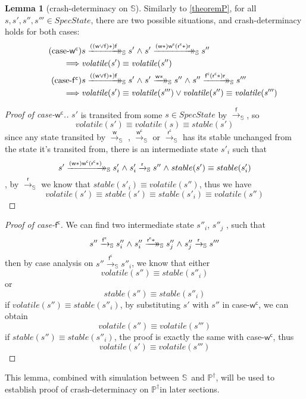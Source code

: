\documentclass[letterpaper,twocolumn,10pt]{article}
\theoremstyle{definition}
\newtheorem{lemma}[theorem]{Lemma}
\newcommand{\conj}{\mathrel\land}
\renewcommand{\i}[1]{\ensuremath{\mathit{#1}}}
\newcommand{\Spec}{\ensuremath{\mathbb S}}
\newcommand{\ProgInv}{\ensuremath{\mathbb P^\dagger}}
\newcommand{\actw}{\mathsf w}
\newcommand{\actwc}{\mathsf w^\mathsf{c}}
\newcommand{\actf}{\mathsf f}
\newcommand{\actr}{\mathsf r}
\newcommand{\actfc}{\mathsf{f^c}}
\newcommand{\actrc}{\mathsf{r^c}}
\newcommand{\ttIn}[2]{\xrightarrow{#1}_{#2}}
\newcommand{\dxrightarrow}[1]{\xrightarrow{#1}\mathrel{\mkern-14mu}\rightarrow}
\newcommand{\ttsIn}[2]{\dxrightarrow{#1}_{#2}}
\newcommand{\ttS}[1]{\ttIn{#1}{\Spec}}
\newcommand{\ttsS}[1]{\ttsIn{#1}{\Spec}}
\begin{document}
\begin{lemma}[crash-determinacy on \Spec]\label{cdS}
	Similarly to \cref{theoremP}, for all $s, s',s'', s''' \in \i{SpecState}$, there are two possible situations, and crash-determinacy holds for both cases:
	\begin{align*}
		\tag{case-$\actwc$}
			&s \ttsS{\i{((\actw \lor \actf)\ast)} \actf} s' \conj s' \ttsS{\i{(\actw\ast)} \actwc \i{(\actrc\ast)} \actr} s'' \\
		\implies &\i{volatile(s')} \equiv \i{volatile(s'')}
\\
		\tag{case-$\actfc$}
		&s \ttsS{(\i{(\actw \lor \actf)\ast}) \actf} s' \conj
	  s' \ttsS{\i{\actw\ast}} s'' \conj
	  s'' \ttsS{\actfc  (\i{\actrc\ast}) \actr } s'''\\
		\implies &\i{volatile(s')} \equiv \i{volatile(s''')} \lor \i{volatile(s'')} \equiv \i{volatile(s''')}
	\end{align*}
\end{lemma}
\begin{proof}[Proof of case-\i{\actwc}.]
	$s'$ is transited from some $s \in \i{SpecState}$ by \i{\ttS{\actf}}, so
		$$\i{volatile(s')} \equiv \i{volatile(s)} \equiv \i{stable(s')}$$
	since any state transited by \i{\ttS{\actw}} , \i{\ttS{\actwc}} or \i{\ttS{\actrc}} has its stable unchanged from the state it's transited from, there is an intermediate state $s'_i$ such that
		$$s' \ttsS{\i{(\actw\ast)} \actwc \i{(\actrc*)}} s'_i \conj s'_i \ttS{\actr} s'' \conj stable(s') \equiv stable(s'_i)$$
	, by \i{\ttS{\actr}} we know that $\i{stable(s'_i) \equiv volatile(s'')}$, thus we have
		$$\i{volatile(s') \equiv stable(s') \equiv stable(s'_i) \equiv volatile(s'')}$$
\end{proof}
\begin{proof}[Proof of case-\i{\actfc}]
	We can find two intermediate state $s''_i$, $s''_j$ , such that $$s'' \ttS{\actfc} s''_i \conj s''_i \ttsS{\actrc*} s''_j \conj s''_j  \ttS{\actr} s'''$$
	then by case analysis on $s'' \ttS{\actfc} s''_i$, we know that either $$\i{volatile(s'') \equiv stable(s''_i)}$$ or $$\i{stable(s'') \equiv stable(s''_i)}$$
	if $\i{volatile(s'') \equiv stable(s''_i)}$, by substituting $s'$ with $s''$ in
	\mbox{case-$\actwc$}, we can obtain $$\i{volatile(s'') \equiv volatile(s''')}$$
	if $\i{stable(s'') \equiv stable(s''_i)}$, the proof is exactly the same with \mbox{case-$\actwc$}, thus $$\i{volatile(s') \equiv volatile(s''')}$$
\end{proof}
This lemma, combined with simulation between \Spec\ and \ProgInv, will be used to establish proof of crash-determinacy on \ProgInv in later sections.
\end{document}
